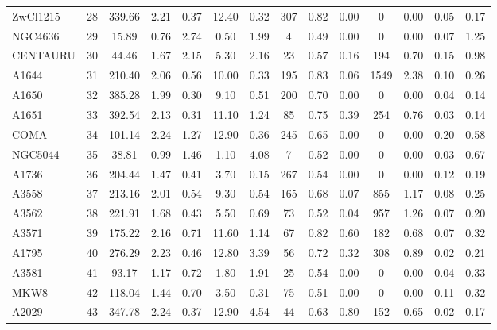 \documentclass[10pt,aps,pra,reprint,amsmath,amsfonts,amssymb,showpacs,nofootinbib,floatfix]{revtex4-1}
\newcommand{\vst}{\vspace{-0.14mm}}
\begin{document}
\begin{table}
\begin{minipage}{2.0\columnwidth}
\begin{tabular}{l  c c c c c c c c c c c c c}
ZwCl1215 &  28 & 339.66 &   2.21 &   0.37 &  12.40 &   0.32 & 307 &   0.82 &   0.00 &    0 &   0.00 &   0.05 &   0.17 \vst \\
NGC4636  &  29 &  15.89 &   0.76 &   2.74 &   0.50 &   1.99 &   4 &   0.49 &   0.00 &    0 &   0.00 &   0.07 &   1.25 \vst \\
CENTAURU &  30 &  44.46 &   1.67 &   2.15 &   5.30 &   2.16 &  23 &   0.57 &   0.16 &  194 &   0.70 &   0.15 &   0.98 \vst \\
A1644    &  31 & 210.40 &   2.06 &   0.56 &  10.00 &   0.33 & 195 &   0.83 &   0.06 & 1549 &   2.38 &   0.10 &   0.26 \vst \\
A1650    &  32 & 385.28 &   1.99 &   0.30 &   9.10 &   0.51 & 200 &   0.70 &   0.00 &    0 &   0.00 &   0.04 &   0.14 \vst \\
A1651    &  33 & 392.54 &   2.13 &   0.31 &  11.10 &   1.24 &  85 &   0.75 &   0.39 &  254 &   0.76 &   0.03 &   0.14 \vst \\
COMA     &  34 & 101.14 &   2.24 &   1.27 &  12.90 &   0.36 & 245 &   0.65 &   0.00 &    0 &   0.00 &   0.20 &   0.58 \vst \\
NGC5044  &  35 &  38.81 &   0.99 &   1.46 &   1.10 &   4.08 &   7 &   0.52 &   0.00 &    0 &   0.00 &   0.03 &   0.67 \vst \\
A1736    &  36 & 204.44 &   1.47 &   0.41 &   3.70 &   0.15 & 267 &   0.54 &   0.00 &    0 &   0.00 &   0.12 &   0.19 \vst \\
A3558    &  37 & 213.16 &   2.01 &   0.54 &   9.30 &   0.54 & 165 &   0.68 &   0.07 &  855 &   1.17 &   0.08 &   0.25 \vst \\
A3562    &  38 & 221.91 &   1.68 &   0.43 &   5.50 &   0.69 &  73 &   0.52 &   0.04 &  957 &   1.26 &   0.07 &   0.20 \vst \\
A3571    &  39 & 175.22 &   2.16 &   0.71 &  11.60 &   1.14 &  67 &   0.82 &   0.60 &  182 &   0.68 &   0.07 &   0.32 \vst \\
A1795    &  40 & 276.29 &   2.23 &   0.46 &  12.80 &   3.39 &  56 &   0.72 &   0.32 &  308 &   0.89 &   0.02 &   0.21 \vst \\
A3581    &  41 &  93.17 &   1.17 &   0.72 &   1.80 &   1.91 &  25 &   0.54 &   0.00 &    0 &   0.00 &   0.04 &   0.33 \vst \\
MKW8     &  42 & 118.04 &   1.44 &   0.70 &   3.50 &   0.31 &  75 &   0.51 &   0.00 &    0 &   0.00 &   0.11 &   0.32 \vst \\
A2029    &  43 & 347.78 &   2.24 &   0.37 &  12.90 &   4.54 &  44 &   0.63 &   0.80 &  152 &   0.65 &   0.02 &   0.17 \vst \\

\end{tabular}
\end{minipage}
\end{table}
\end{document}
